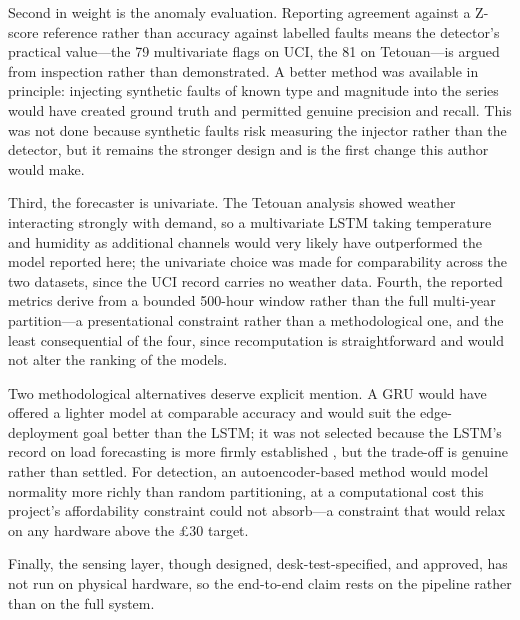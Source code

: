 \documentclass[11pt,a4paper]{article}
\begin{document}
Second in weight is the anomaly evaluation. Reporting agreement against a
Z-score reference rather than accuracy against labelled faults means the
detector's practical value---the 79 multivariate flags on UCI, the 81 on
Tetouan---is argued from inspection rather than demonstrated. A better method
was available in principle: injecting synthetic faults of known type and
magnitude into the series would have created ground truth and permitted genuine
precision and recall. This was not done because synthetic faults risk measuring
the injector rather than the detector, but it remains the stronger design and
is the first change this author would make.

Third, the forecaster is univariate. The Tetouan analysis showed weather
interacting strongly with demand, so a multivariate LSTM taking temperature and
humidity as additional channels would very likely have outperformed the model
reported here; the univariate choice was made for comparability across the two
datasets, since the UCI record carries no weather data. Fourth, the reported
metrics derive from a bounded 500-hour window rather than the full multi-year
partition---a presentational constraint rather than a methodological one, and
the least consequential of the four, since recomputation is straightforward and
would not alter the ranking of the models.

Two methodological alternatives deserve explicit mention. A GRU would have
offered a lighter model at comparable accuracy \cite{mahjoub2022predicting} and
would suit the edge-deployment goal better than the LSTM; it was not selected
because the LSTM's record on load forecasting is more firmly established
\cite{kong2017short}, but the trade-off is genuine rather than settled. For
detection, an autoencoder-based method \cite{pereira2018unsupervised} would
model normality more richly than random partitioning, at a computational cost
this project's affordability constraint could not absorb---a constraint that
would relax on any hardware above the \pounds30 target.

Finally, the sensing layer, though designed, desk-test-specified, and approved,
has not run on physical hardware, so the end-to-end claim rests on the pipeline
rather than on the full system.
\end{document}
